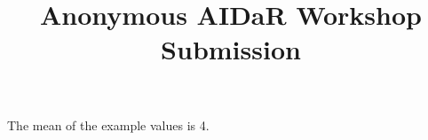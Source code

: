 \documentclass{article}
\title{Anonymous AIDaR Workshop Submission}
\begin{document}
\maketitle
The mean of the example values is 4.
\end{document}
